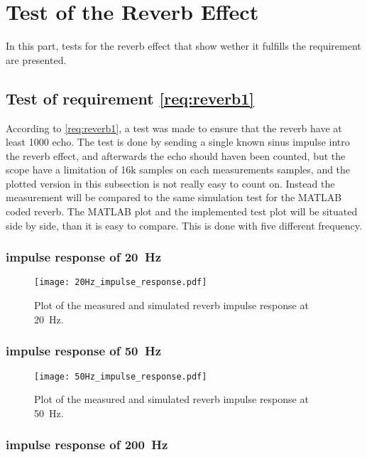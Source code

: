 \newpage
\section{Test of the Reverb Effect}
In this part, tests for the reverb effect that show wether it fulfills the requirement are presented. 


\subsection{Test of requirement \autoref{req:reverb1}}
According to \autoref{req:reverb1}, a test was made to ensure that the \gls{reverb} have at least 1000 echo. The test is done by sending a single known sinus impulse intro the \gls{reverb} effect, and afterwards the echo should haven been counted, but the scope have a limitation of 16k samples on each measurements samples, and the plotted version in this subsection is not really easy to count on. Instead the measurement will be compared to the same simulation test for the MATLAB coded \gls{reverb}. The MATLAB plot and the implemented test plot will be situated side by side, than it is easy to compare. This is done with five different frequency. 

\subsubsection*{impulse response of \SI{20}{\hertz}}


\begin{figure}[htbp!]
    \centering
        \texttt{[image: 20Hz\_impulse\_response.pdf]}
        \caption{Plot of the measured and simulated \gls{reverb} impulse response at \SI{20}{\hertz}.}
        \label{fig:tests:reverb:20Hz}
  \end{figure}
  
  \newpage
  
\subsubsection*{impulse response of \SI{50}{\hertz}}

\begin{figure}[htbp!]
    \centering
        \texttt{[image: 50Hz\_impulse\_response.pdf]}
        \caption{Plot of the measured and simulated \gls{reverb} impulse response at \SI{50}{\hertz}.}
        \label{fig:tests:reverb:50Hz}
  \end{figure}

\subsubsection*{impulse response of \SI{200}{\hertz}}

